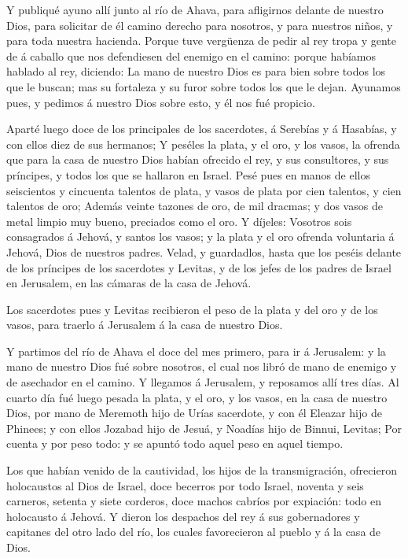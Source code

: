  Y publiqué ayuno allí junto al río de Ahava, para
afligirnos delante de nuestro Dios, para solicitar de él camino derecho
para nosotros, y para nuestros niños, y para toda nuestra hacienda.
 Porque tuve vergüenza de pedir al rey tropa y gente de á
caballo que nos defendiesen del enemigo en el camino: porque habíamos
hablado al rey, diciendo: La mano de nuestro Dios es para bien sobre
todos los que le buscan; mas su fortaleza y su furor sobre todos los que
le dejan.  Ayunamos pues, y pedimos á nuestro Dios sobre
esto, y él nos fué propicio.

 Aparté luego doce de los principales de los sacerdotes, á
Serebías y á Hasabías, y con ellos diez de sus hermanos;  Y
peséles la plata, y el oro, y los vasos, la ofrenda que para la casa de
nuestro Dios habían ofrecido el rey, y sus consultores, y sus príncipes,
y todos los que se hallaron en Israel.  Pesé pues en manos
de ellos seiscientos y cincuenta talentos de plata, y vasos de plata por
cien talentos, y cien talentos de oro;  Además veinte
tazones de oro, de mil dracmas; y dos vasos de metal limpio muy bueno,
preciados como el oro.  Y díjeles: Vosotros sois
consagrados á Jehová, y santos los vasos; y la plata y el oro ofrenda
voluntaria á Jehová, Dios de nuestros padres.  Velad, y
guardadlos, hasta que los peséis delante de los príncipes de los
sacerdotes y Levitas, y de los jefes de los padres de Israel en
Jerusalem, en las cámaras de la casa de Jehová.

 Los sacerdotes pues y Levitas recibieron el peso de la
plata y del oro y de los vasos, para traerlo á Jerusalem á la casa de
nuestro Dios.

 Y partimos del río de Ahava el doce del mes primero, para
ir á Jerusalem: y la mano de nuestro Dios fué sobre nosotros, el cual
nos libró de mano de enemigo y de asechador en el camino. 
Y llegamos á Jerusalem, y reposamos allí tres días.  Al
cuarto día fué luego pesada la plata, y el oro, y los vasos, en la casa
de nuestro Dios, por mano de Meremoth hijo de Urías sacerdote, y con él
Eleazar hijo de Phinees; y con ellos Jozabad hijo de Jesuá, y Noadías
hijo de Binnui, Levitas;  Por cuenta y por peso todo: y se
apuntó todo aquel peso en aquel tiempo.

 Los que habían venido de la cautividad, los hijos de la
transmigración, ofrecieron holocaustos al Dios de Israel, doce becerros
por todo Israel, noventa y seis carneros, setenta y siete corderos, doce
machos cabríos por expiación: todo en holocausto á Jehová. 
Y dieron los despachos del rey á sus gobernadores y capitanes del otro
lado del río, los cuales favorecieron al pueblo y á la casa de Dios.

